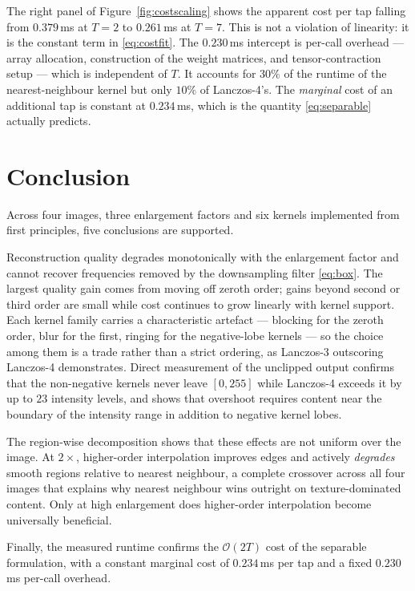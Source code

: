 \documentclass[11pt,a4paper]{article}
\begin{document}
The right panel of Figure~\ref{fig:costscaling} shows the apparent cost per tap falling from
$0.379$\,ms at $T=2$ to $0.261$\,ms at $T=7$. This is not a violation of linearity: it is the
constant term in \eqref{eq:costfit}. The $0.230$\,ms intercept is per-call overhead --- array
allocation, construction of the weight matrices, and tensor-contraction setup --- which is
independent of $T$. It accounts for $30\%$ of the runtime of the nearest-neighbour kernel but
only $10\%$ of Lanczos-4's. The \emph{marginal} cost of an additional tap is constant at
$0.234$\,ms, which is the quantity \eqref{eq:separable} actually predicts.

\section{Conclusion}

Across four images, three enlargement factors and six kernels implemented from first
principles, five conclusions are supported.

Reconstruction quality degrades monotonically with the enlargement factor and cannot recover
frequencies removed by the downsampling filter \eqref{eq:box}. The largest quality gain comes
from moving off zeroth order; gains beyond second or third order are small while cost
continues to grow linearly with kernel support. Each kernel family carries a characteristic
artefact --- blocking for the zeroth order, blur for the first, ringing for the negative-lobe
kernels --- so the choice among them is a trade rather than a strict ordering, as Lanczos-3
outscoring Lanczos-4 demonstrates. Direct measurement of the unclipped output confirms that
the non-negative kernels never leave $[0,255]$ while Lanczos-4 exceeds it by up to $23$
intensity levels, and shows that overshoot requires content near the boundary of the intensity
range in addition to negative kernel lobes.

The region-wise decomposition shows that these effects are not uniform over the image. At
$2\times$, higher-order interpolation improves edges and actively \emph{degrades} smooth
regions relative to nearest neighbour, a complete crossover across all four images that
explains why nearest neighbour wins outright on texture-dominated content. Only at high
enlargement does higher-order interpolation become universally beneficial.

Finally, the measured runtime confirms the $\mathcal{O}(2T)$ cost of the separable
formulation, with a constant marginal cost of $0.234$\,ms per tap and a fixed $0.230$\,ms
per-call overhead.
\end{document}
